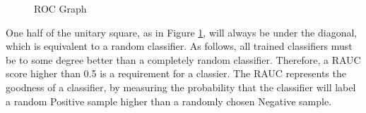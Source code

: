 		\begin{figure}[H]
			\centering
			\footnotesize
			\scalebox{.8}{}
			\captionsetup{width=0.8\textwidth}
			\caption{ROC Graph}
			\label{fig:roc}
		\end{figure}
		
		\par
		
		One half of the unitary square, as in Figure \ref{fig:roc}, will always be under the diagonal, which is equivalent to a random classifier. As follows, all trained classifiers must be to some degree better than a completely random classifier. Therefore, a RAUC score higher than 0.5 is a requirement for a classier. The RAUC represents the goodness of a classifier, by measuring the probability that the classifier will label a random Positive sample higher than a randomly chosen Negative sample. 
		
		\vspace{1cm}
		
